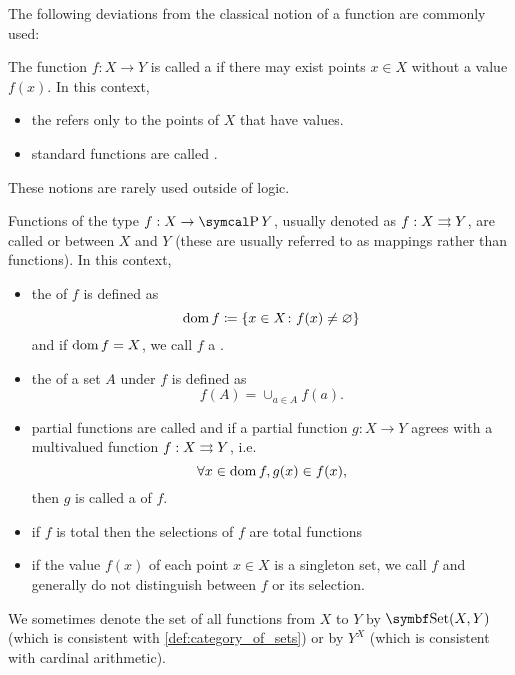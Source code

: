 \begin{definition}
  The following deviations from the classical notion of a function are commonly used:
  \begin{itemize}
     The function \( f: X \to Y \) is called a if there may exist points \( x \in X \) without a value \( f(x) \). In this context,
    \begin{itemize}
      \item the  refers only to the points of \( X \) that have values.
      \item standard functions are called .
    \end{itemize}

    These notions are rarely used outside of logic.

     Functions of the type \( f: X \to \Power Y \), usually denoted as \( f: X \rightrightarrows Y \), are called   or  between \( X \) and \( Y \) (these are usually referred to as mappings rather than functions). In this context,
    \begin{itemize}
      \item the  of \( f \) is defined as
      \begin{equation*}
        \operatorname{dom} f \coloneqq \{ x \in X \colon f(x) \neq \varnothing \}
      \end{equation*}
      and if \( \operatorname{dom} f = X \), we call \( f \) a .

      \item the  of a set \( A \) under \( f \) is defined as
      \begin{equation*}
        f(A) = \cup_{a \in A} f(a).
      \end{equation*}

      \item partial functions are called  and if a partial function \( g: X \to Y \) agrees with a multivalued function \( f: X \rightrightarrows Y \), i.e.
      \begin{equation*}
        \forall x \in \operatorname{dom} f, g(x) \in f(x),
      \end{equation*}
      then \( g \) is called a  of \( f \).

      \item if \( f \) is total then the selections of \( f \) are total functions

      \item if the value \( f(x) \) of each point \( x \in X \) is a singleton set, we call \( f \)  and generally do not distinguish between \( f \) or its selection.
    \end{itemize}
  \end{itemize}

  We sometimes denote the set of all functions from \( X \) to \( Y \) by \( \Cat{Set}(X, Y) \) (which is consistent with \cref{def:category_of_sets}) or by \( Y^X \) (which is consistent with cardinal arithmetic).
\end{definition}

